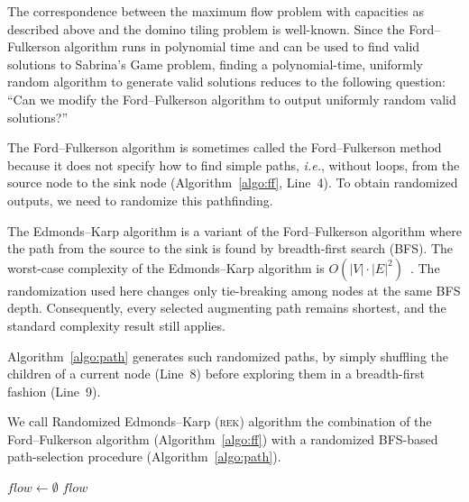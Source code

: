 \documentclass[svgnames,table,runningheads]{llncs}
\newcommand{\rek}{\textsc{rek}\xspace}
\begin{document}
The correspondence between the maximum flow problem with capacities as described above and the domino tiling problem is well-known. Since the Ford--Fulkerson algorithm runs in polynomial time and can be used to find valid solutions to Sabrina's Game problem, finding a polynomial-time, uniformly random algorithm to generate valid solutions reduces to the following question: ``Can we modify the Ford--Fulkerson algorithm to output uniformly random valid solutions?''

The Ford--Fulkerson algorithm is sometimes called the Ford--Fulkerson method because it does not specify how to find simple paths, {\it i.e.}, without loops, from the source node to the sink node (Algorithm~\ref{algo:ff}, Line~4). To obtain randomized outputs, we need to randomize this pathfinding. 

The Edmonds--Karp algorithm is a variant of the Ford--Fulkerson algorithm where the path from the source to the sink is found by breadth-first search (BFS). The worst-case complexity of the Edmonds--Karp algorithm is $O(|V|\cdot |E|^2)$~\cite{edmondskarp1972}. The randomization used here changes only tie-breaking among nodes at the same BFS depth. Consequently, every selected augmenting path remains shortest, and the standard complexity result still applies.

Algorithm~\ref{algo:path} generates such randomized paths, by simply shuffling the children of a current node (Line~8) before exploring them in a breadth-first fashion (Line~9).

We call Randomized Edmonds--Karp (\rek) algorithm the combination of the Ford--Fulkerson algorithm (Algorithm~\ref{algo:ff}) with a randomized BFS-based path-selection procedure (Algorithm~\ref{algo:path}).
 
\begin{algorithm}[t]
  \DontPrintSemicolon
  $flow \gets \emptyset$\;
  \Return $flow$\;
  \caption{Ford--Fulkerson}\label{algo:ff} 
\end{algorithm}
\end{document}
